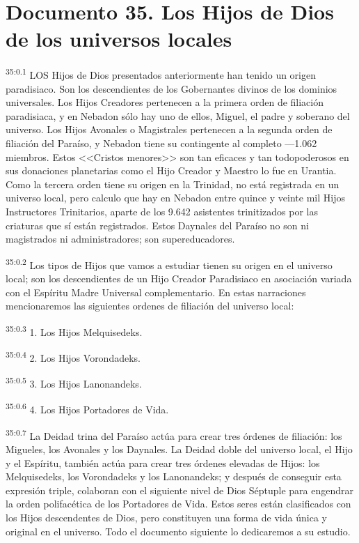 \chapter{Documento 35. Los Hijos de Dios de los universos locales}
\par
\textsuperscript{35:0.1} LOS Hijos de Dios presentados anteriormente han tenido un origen paradisiaco. Son los descendientes de los Gobernantes divinos de los dominios universales. Los Hijos Creadores pertenecen a la primera orden de filiación paradisiaca, y en Nebadon sólo hay uno de ellos, Miguel, el padre y soberano del universo. Los Hijos Avonales o Magistrales pertenecen a la segunda orden de filiación del Paraíso, y Nebadon tiene su contingente al completo ---1.062 miembros. Estos <<Cristos menores>> son tan eficaces y tan todopoderosos en sus donaciones planetarias como el Hijo Creador y Maestro lo fue en Urantia. Como la tercera orden tiene su origen en la Trinidad, no está registrada en un universo local, pero calculo que hay en Nebadon entre quince y veinte mil Hijos Instructores Trinitarios, aparte de los 9.642 asistentes trinitizados por las criaturas que sí están registrados. Estos Daynales del Paraíso no son ni magistrados ni administradores; son supereducadores.

\par
\textsuperscript{35:0.2} Los tipos de Hijos que vamos a estudiar tienen su origen en el universo local; son los descendientes de un Hijo Creador Paradisiaco en asociación variada con el Espíritu Madre Universal complementario. En estas narraciones mencionaremos las siguientes ordenes de filiación del universo local:

\par
\textsuperscript{35:0.3} 1. Los Hijos Melquisedeks.

\par
\textsuperscript{35:0.4} 2. Los Hijos Vorondadeks.

\par
\textsuperscript{35:0.5} 3. Los Hijos Lanonandeks.

\par
\textsuperscript{35:0.6} 4. Los Hijos Portadores de Vida.

\par
\textsuperscript{35:0.7} La Deidad trina del Paraíso actúa para crear tres órdenes de filiación: los Migueles, los Avonales y los Daynales. La Deidad doble del universo local, el Hijo y el Espíritu, también actúa para crear tres órdenes elevadas de Hijos: los Melquisedeks, los Vorondadeks y los Lanonandeks; y después de conseguir esta expresión triple, colaboran con el siguiente nivel de Dios Séptuple para engendrar la orden polifacética de los Portadores de Vida. Estos seres están clasificados con los Hijos descendentes de Dios, pero constituyen una forma de vida única y original en el universo. Todo el documento siguiente lo dedicaremos a su estudio.

